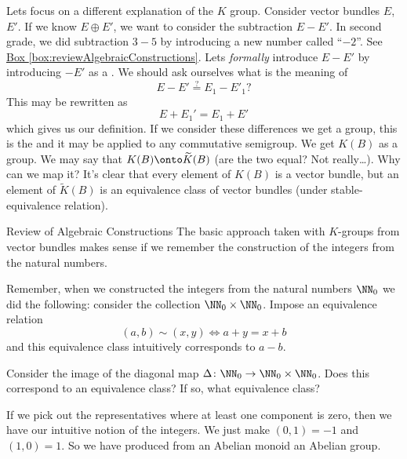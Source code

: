 \bigskip
{}Lets focus on a different explanation of the $K$ group. Consider
vector bundles $E$, $E'$. If we know  $E\oplus E'$, we want to
consider the subtraction $E-E'$. In second grade, we did
subtraction $3-5$ by introducing a new number called
``$-2$''. See \hyperref[box:reviewAlgebraicConstructions]{Box \ref*{box:reviewAlgebraicConstructions}}.
Lets \emph{formally} introduce $E-E'$ by introducing $-E'$ as a
.
We should ask ourselves what is the meaning of
\begin{equation}
E-E'\stackrel{?}{=}E_{1}-E'_{1}?
\end{equation}
This may be rewritten as
\begin{equation}
E+E_{1}'=E_{1}+E'
\end{equation}
which gives us our definition.  If we consider these differences
we get a group, this is the 
and it may be applied to any commutative semigroup. We get $K(B)$
as a group. We may say that $K(B)\onto\widetilde{K}(B)$ 
(are the two equal? Not really\dots). Why can we map it? It's
clear that every element of $K(B)$ is a vector bundle, but an
element of $\widetilde{K}(B)$ is an equivalence class of vector
bundles (under stable-equivalence relation).

\begin{Boxed}{Review of Algebraic Constructions}\label{box:reviewAlgebraicConstructions}
The basic approach taken with $K$-groups from vector bundles
makes sense if we remember the construction of the integers from
the natural numbers.

Remember, when we constructed the integers from the natural
numbers $\NN_0$ we did the following: consider the collection
$\NN_0\times\NN_0$. Impose an equivalence relation
\begin{equation}
(a,b)\sim(x,y)\iff a+y=x+b
\end{equation}
and this equivalence class intuitively corresponds to $a-b$. 

\begin{prob}
Consider the image of the diagonal map
$\Delta\colon\NN_0\to\NN_0\times\NN_0$. Does this correspond to
an equivalence class? If so, what equivalence class?
\end{prob}

If we pick out the representatives where at least one component is
zero, then we have our intuitive notion of the integers. We just
make $(0,1)=-1$ and $(1,0)=1$. So we have produced from an
Abelian monoid an Abelian group.
\end{Boxed}

